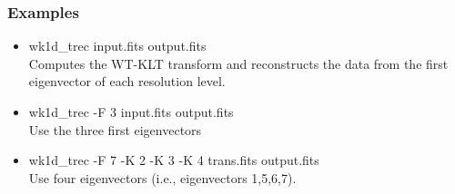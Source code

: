 \subsubsection*{Examples}
\begin{itemize}
\item wk1d\_trec input.fits output.fits \\
Computes the WT-KLT  transform and reconstructs the data from
the first eigenvector of each resolution level.
\item wk1d\_trec -F 3  input.fits output.fits \\
Use the three first eigenvectors
\item wk1d\_trec -F 7 -K 2 -K 3 -K 4 trans.fits output.fits \\
Use four eigenvectors (i.e., eigenvectors 1,5,6,7).
\end{itemize}


